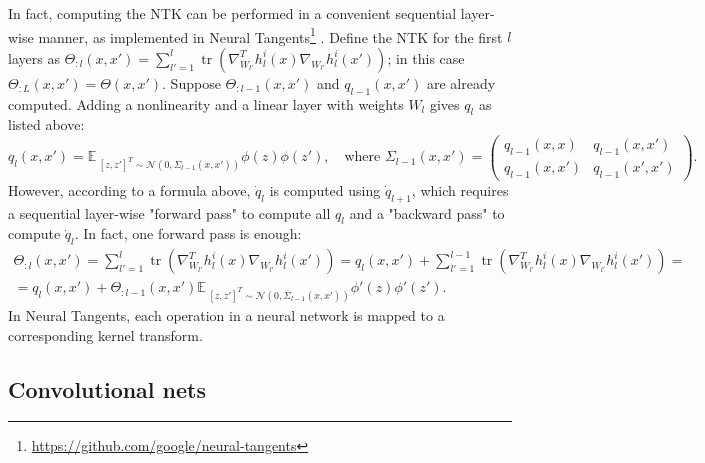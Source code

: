 \documentclass{article}
\newcommand{\EE}{\mathbb{E}\,}
\newcommand{\NN}{\mathcal{N}}
\DeclareMathOperator*{\tr}{tr}
\begin{document}
    In fact, computing the NTK can be performed in a convenient sequential layer-wise manner, as implemented in Neural Tangents\footnote{\url{https://github.com/google/neural-tangents}} \cite{novak2019neural}.
    Define the NTK for the first $l$ layers as $\Theta_{:l}(x,x') = \sum_{l'=1}^l \tr(\nabla_{W_{l'}}^T h_l^i(x) \nabla_{W_{l'}} h_l^i(x'))$; in this case $\Theta_{:L}(x,x') = \Theta(x,x')$.
    Suppose $\Theta_{:l-1}(x,x')$ and $q_{l-1}(x,x')$ are already computed.
    Adding a nonlinearity and a linear layer with weights $W_l$ gives $q_l$ as listed above:
    \begin{equation}
        q_l(x,x') 
        = \EE_{[z,z']^T \sim \NN(0,\Sigma_{l-1}(x,x'))} \phi(z) \phi(z'),
        \quad 
        \text{where $\Sigma_{l-1}(x,x') 
        = \begin{pmatrix} q_{l-1}(x,x) & q_{l-1}(x,x')\\q_{l-1}(x,x') & q_{l-1}(x',x') \end{pmatrix}$.}
        \label{eq:q_iteration}
    \end{equation}
    However, according to a formula above, $\dot q_l$ is computed using $\dot q_{l+1}$, which requires a sequential layer-wise "forward pass" to compute all $q_l$ and a "backward pass" to compute $\dot q_l$.
    In fact, one forward pass is enough:
    \begin{multline}
        \Theta_{:l}(x,x') 
        = \sum_{l'=1}^l \tr(\nabla_{W_{l'}}^T h_l^i(x) \nabla_{W_{l'}} h_l^i(x')) 
        = q_l(x,x') + \sum_{l'=1}^{l-1} \tr(\nabla_{W_{l'}}^T h_l^i(x) \nabla_{W_{l'}} h_l^i(x')) 
        =\\= q_l(x,x') + \Theta_{:l-1}(x,x') \EE_{[z,z']^T \sim \NN(0,\Sigma_{l-1}(x,x'))} \phi'(z) \phi'(z').
        \label{eq:Theta_iteration}
    \end{multline}
    In Neural Tangents, each operation in a neural network is mapped to a corresponding kernel transform.


    \subsection{Convolutional nets}
\end{document}
